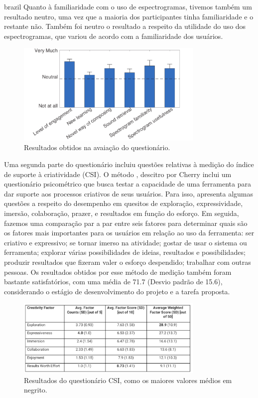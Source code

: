 \begin{otherlanguage*}{brazil}
Quanto à familiaridade com o uso de espectrogramas, tivemos também um resultado neutro, uma vez que a maioria dos participantes tinha familiaridade e o restante não. Também foi neutro o resultado a respeito da utilidade do uso dos espectrogramas, que variou de acordo com a familiaridade dos usuários.


\begin{figure}
\centering
\includegraphics[width=0.8\textwidth]{pictures/cap4/questionnaire_lower}
\caption{\label{amas}Resultados obtidos na avaiação do questionário.}
\label{fig:questionnaire}
\end{figure}

Uma segunda parte do questionário incluiu questões relativas à medição do índice de suporte à criatividade (CSI). O método \cite{Cherry2014}, descitro por Cherry inclui um questionário psicométrico que busca testar a capacidade de uma ferramenta para dar suporte aos processos criativos de seus usuários. Para isso, apresenta algumas questões a respeito do desempenho em quesitos de exploração, expressividade, imersão, colaboração, prazer, e resultados em função do esforço. Em seguida, fazemos uma comparação par a par entre seis fatores para determinar quais são os fatores mais importantes para os usuários em relação ao uso da ferramenta: ser criativo e expressivo; se tornar imerso na atividade; gostar de usar o sistema ou ferramenta; explorar várias possibilidades de ideias, resultados e possibilidades; produzir resultados que fizeram valer o esforço despendido; trabalhar com outras pessoas. Os resultados obtidos por esse método de medição também foram bastante satisfatórios, com uma média de 71.7 (Desvio padrão de 15.6), considerando o estágio de desenvolvimento do projeto e a tarefa proposta.


\begin{figure}
\centering
\includegraphics[width=0.8\textwidth]{pictures/cap4/CSI}
\caption{\label{amas}Resultados do questionário CSI, como os maiores valores médios em negrito.}
\label{fig:questionnaire}
\end{figure}



\end{otherlanguage*}
